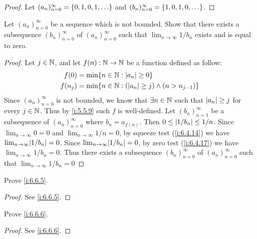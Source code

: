 \begin{proof}
  Let \((a_n)_{n = 0}^\infty = \set{0, 1, 0, 1, \dots}\) and \((b_n)_{n = 0}^\infty = \set{1, 0, 1, 0, \dots}\).
\end{proof}

\begin{ex}\label{i:ex:6.6.3}
  Let \((a_n)_{n = 0}^\infty\) be a sequence which is not bounded.
  Show that there exists a subsequence \((b_n)_{n = 0}^\infty\) of \((a_n)_{n = 0}^\infty\) such that \(\lim_{n \to \infty} 1 / b_n\) exists and is equal to zero.
\end{ex}

\begin{proof}
  Let \(j \in \mathbb{N}\), and let \(f(n) : \mathbb{N} \to \mathbb{N}\) be a function defined as follow:
  \begin{align*}
    f(0)   & = \min\set{n \in \N : \abs{a_n} \geq 0}                         \\
    f(n_j) & = \min\set{n \in \N : (\abs{a_n} \geq j) \land (n > n_{j - 1})}
  \end{align*}
  Since \((a_n)_{n = 0}^\infty\) is not bounded, we know that \(\exists n \in \mathbb{N}\) such that \(\left\lvert a_n\right\rvert \geq j\) for every \(j \in \mathbb{N}\).
  Thus by \cref{i:5.5.9} such \(f\) is well-defined.
  Let \((b_n)_{n = 1}^\infty\) be a subsequence of \((a_n)_{n = 0}^\infty\) where \(b_n = a_{f(n)}\).
  Then \(0 \leq \left\lvert1 / b_n\right\rvert \leq 1 / n\).
  Since \(\lim_{n \to \infty} 0 = 0\) and \(\lim_{n \to \infty} 1 / n = 0\), by squeeze test (\cref{i:6.4.14}) we have \(\lim_{n \to \infty} \abs{1 / b_n} = 0\).
  Since \(\lim_{n \to \infty} \abs{1 / b_n} = 0\), by zero test (\cref{i:6.4.17}) we have \(\lim_{n \to \infty} 1 / b_n = 0\).
  Thus there exists a subsequence \((b_n)_{n = 0}^\infty\) of \((a_n)_{n = 0}^\infty\) such that \(\lim_{n \to \infty} 1 / b_n = 0\)
\end{proof}

\begin{ex}\label{i:ex:6.6.4}
  Prove \cref{i:6.6.5}.
\end{ex}

\begin{proof}
  See \cref{i:6.6.5}.
\end{proof}

\begin{ex}\label{i:ex:6.6.5}
  Prove \cref{i:6.6.6}.
\end{ex}

\begin{proof}
  See \cref{i:6.6.6}.
\end{proof}
